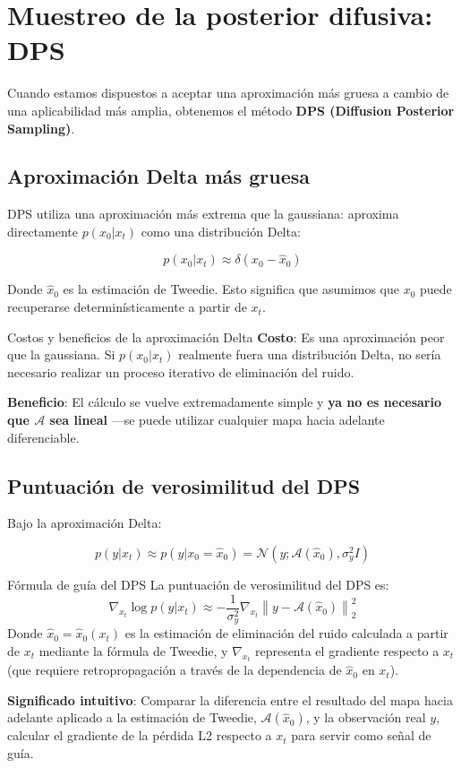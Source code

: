 \section{Muestreo de la posterior difusiva: DPS}

Cuando estamos dispuestos a aceptar una aproximación más gruesa a cambio de una aplicabilidad más amplia, obtenemos el método \textbf{DPS (Diffusion Posterior Sampling)}.

\subsection{Aproximación Delta más gruesa}

DPS utiliza una aproximación más extrema que la gaussiana: aproxima directamente $p(x_0 | x_t)$ como una distribución Delta:

$$
p(x_0 | x_t) \approx \delta(x_0 - \hat{x}_0)
$$

Donde $\hat{x}_0$ es la estimación de Tweedie. Esto significa que asumimos que $x_0$ puede recuperarse determinísticamente a partir de $x_t$.

\begin{warningbox}{Costos y beneficios de la aproximación Delta}
\textbf{Costo}: Es una aproximación peor que la gaussiana. Si $p(x_0|x_t)$ realmente fuera una distribución Delta, no sería necesario realizar un proceso iterativo de eliminación del ruido.

\textbf{Beneficio}: El cálculo se vuelve extremadamente simple y \textbf{ya no es necesario que $\mathcal{A}$ sea lineal} —se puede utilizar cualquier mapa hacia adelante diferenciable.
\end{warningbox}

\subsection{Puntuación de verosimilitud del DPS}

Bajo la aproximación Delta:

$$
p(y | x_t) \approx p(y | x_0 = \hat{x}_0) = \mathcal{N}(y; \mathcal{A}(\hat{x}_0), \sigma_y^2 I)
$$

\begin{importantbox}{Fórmula de guía del DPS}
La puntuación de verosimilitud del DPS es:
$$
\nabla_{x_t} \log p(y | x_t) \approx -\frac{1}{\sigma_y^2} \nabla_{x_t} \left\| y - \mathcal{A}(\hat{x}_0) \right\|_2^2
$$
Donde $\hat{x}_0 = \hat{x}_0(x_t)$ es la estimación de eliminación del ruido calculada a partir de $x_t$ mediante la fórmula de Tweedie, y $\nabla_{x_t}$ representa el gradiente respecto a $x_t$ (que requiere retropropagación a través de la dependencia de $\hat{x}_0$ en $x_t$).

\textbf{Significado intuitivo}: Comparar la diferencia entre el resultado del mapa hacia adelante aplicado a la estimación de Tweedie, $\mathcal{A}(\hat{x}_0)$, y la observación real $y$, calcular el gradiente de la pérdida L2 respecto a $x_t$ para servir como señal de guía.
\end{importantbox}

